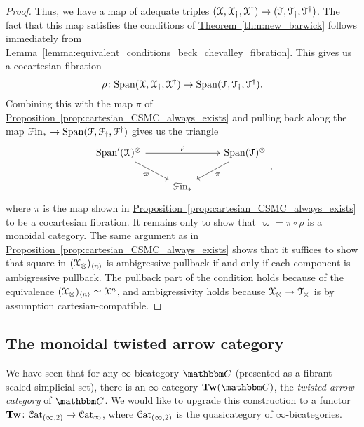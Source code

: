 \documentclass[main.tex]{subfiles}
\begin{document}
\begin{proof}
  Thus, we have a map of adequate triples $(\mathcal{X}, \mathcal{X}_{\dagger}, \mathcal{X}^{\dagger}) \to (\mathcal{T}, \mathcal{T}_{\dagger}, \mathcal{T}^{\dagger})$.
  The fact that this map satisfies the conditions of \hyperref[thm:new_barwick]{Theorem~\ref*{thm:new_barwick}} follows immediately from \hyperref[lemma:equivalent_conditions_beck_chevalley_fibration]{Lemma~\ref*{lemma:equivalent_conditions_beck_chevalley_fibration}}. This gives us a cocartesian fibration
  \begin{equation*}
    \rho\colon \mathrm{Span}(\mathcal{X}, \mathcal{X}_{\dagger}, \mathcal{X}^{\dagger}) \to \mathrm{Span}(\mathcal{T}, \mathcal{T}_{\dagger}, \mathcal{T}^{\dagger}).
  \end{equation*}
  Combining this with the map $\pi$ of \hyperref[prop:cartesian_CSMC_always_exists]{Proposition~\ref*{prop:cartesian_CSMC_always_exists}} and pulling back along the map $\mathcal{F}\mathrm{in}_{*} \to \mathrm{Span}(\mathcal{F}, \mathcal{F}_{\dagger}, \mathcal{F}^{\dagger})$ gives us the triangle
  \begin{equation*}
    \begin{tikzcd}
      \Span'(\category{X})^{\otimes}
      \arrow[rr, "\rho"]
      \arrow[dr, swap, "\varpi"]
      && \Span(\category{T})^{\otimes}
      \arrow[dl, "\pi"]
      \\
      & \Finp
    \end{tikzcd},
  \end{equation*}
  where $\pi$ is the map shown in \hyperref[prop:cartesian_CSMC_always_exists]{Proposition~\ref*{prop:cartesian_CSMC_always_exists}} to be a cocartesian fibration. It remains only to show that $\varpi = \pi \circ \rho$ is a monoidal category. The same argument as in \hyperref[prop:cartesian_CSMC_always_exists]{Proposition~\ref*{prop:cartesian_CSMC_always_exists}} shows that it suffices to show that square in $(\mathcal{X}_{\otimes})_{\langle n \rangle}$ is ambigressive pullback if and only if each component is ambigressive pullback. The pullback part of the condition holds because of the equivalence $(\mathcal{X}_{\otimes})_{\langle n \rangle} \simeq \mathcal{X}^{n}$, and ambigressivity holds because $\mathcal{X}_{\otimes} \to \mathcal{T}_{\times}$ is by assumption cartesian-compatible.
\end{proof}


\subsection{The monoidal twisted arrow category}
\label{ssc:the_monoidal_twisted_arrow_category}

We have seen that for any $\infty$-bicategory $\CC$ (presented as a fibrant scaled simplicial set), there is an $\infty$-category $\Tw(\CC)$, the \emph{twisted arrow category} of $\CC$. We would like to upgrade this construction to a functor $\mathbf{Tw}\colon \mathcal{C}\mathrm{at}_{(\infty,2)} \to \mathcal{C}\mathrm{at}_{\infty}$, where $\mathcal{C}\mathrm{at}_{(\infty,2)}$ is the quasicategory of $\infty$-bicategories.
\end{document}
